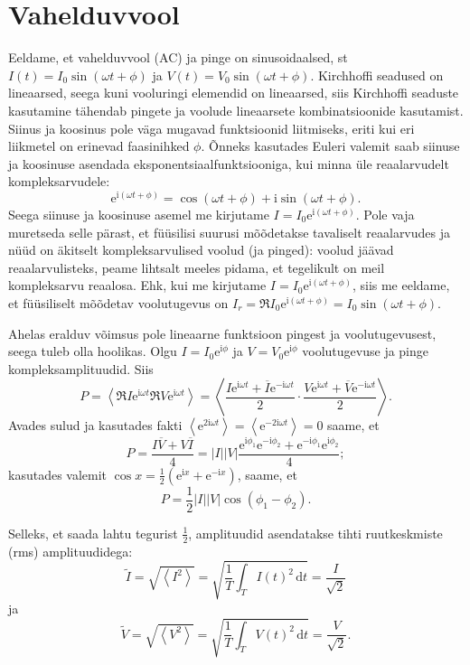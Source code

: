 \documentclass[a4paper,11pt,twocolumn]{article}
\newcommand*\iu{\mathrm{i}}
\begin{document}
\section{Vahelduvvool}
Eeldame, et vahelduvvool (AC) ja pinge on sinusoidaalsed, st $I(t)=I_0 \sin(\omega t + \phi)$ ja $V(t)=V_0 \sin(\omega t + \phi)$.
Kirchhoffi seadused on lineaarsed, seega kuni vooluringi elemendid on lineaarsed, siis Kirchhoffi seaduste kasutamine tähendab pingete ja voolude lineaarsete kombinatsioonide kasutamist.
Siinus ja koosinus pole väga mugavad funktsioonid liitmiseks, eriti kui eri liikmetel on erinevad faasinihked $\phi$.
Õnneks kasutades Euleri valemit saab siinuse ja koosinuse asendada eksponentsiaalfunktsiooniga, kui minna üle reaalarvudelt kompleksarvudele:
\[
    \mathrm{e}^{\iu(\omega t + \phi)}=\cos(\omega t + \phi) + \iu \sin(\omega t + \phi)
.\]
Seega siinuse ja koosinuse asemel me kirjutame $I=I_0 \mathrm{e}^{\iu (\omega t + \phi)}$.
Pole vaja muretseda selle pärast, et füüsilisi suurusi mõõdetakse tavaliselt reaalarvudes ja nüüd on äkitselt kompleksarvulised voolud (ja pinged): voolud jäävad reaalarvulisteks, peame lihtsalt meeles pidama, et tegelikult on meil kompleksarvu reaalosa.
Ehk, kui me kirjutame $I=I_0 \mathrm{e}^{\iu (\omega t + \phi)}$, siis me eeldame, et füüsiliselt mõõdetav voolutugevus on $I_r=\Re I_0 \mathrm{e}^{\iu (\omega t + \phi)}=I_0 \sin(\omega t + \phi)$.


Ahelas eralduv võimsus pole lineaarne funktsioon pingest ja voolutugevusest, seega tuleb olla hoolikas.
Olgu $I=I_0 \mathrm{e}^{\iu \phi}$ ja $V=V_0  \mathrm{e}^{\iu \phi}$ voolutugevuse ja pinge kompleksamplituudid.
Siis
\[
    P=\left< \Re I \mathrm{e}^{\iu \omega t} \Re V \mathrm{e}^{\iu \omega t} \right> = \left<\frac{I \mathrm{e}^{\iu \omega t} + \overline{I}\mathrm{e}^{-\iu \omega t}}{2} \cdot \frac{V \mathrm{e}^{\iu \omega t} + \overline{V}\mathrm{e}^{-\iu \omega t}}{2} \right>
.\]
Avades sulud ja kasutades fakti $\left< \mathrm{e}^{2 \iu \omega t} \right> = \left<\mathrm{e}^{-2 \iu \omega t} \right> =0$ saame, et
\[
    P=\frac{I \overline{V}+V\overline{I}}{4}=|I| |V| \frac{\mathrm{e}^{\iu \phi_1}\mathrm{e}^{-\iu \phi_2} + \mathrm{e}^{-\iu\phi_1}\mathrm{e}^{\iu \phi_2}}{4}
;\]
kasutades valemit $\cos x=\frac{1}{2}\left( \mathrm{e}^{\iu x}+ \mathrm{e}^{-\iu x} \right) $, saame, et
\[
    P=\frac{1}{2}|I| |V| \cos(\phi_1-\phi_2)
.\]

Selleks, et saada lahtu tegurist $\frac{1}{2}$, amplituudid asendatakse tihti ruutkeskmiste (rms) amplituudidega:
\[
    \tilde{I}=\sqrt{\left< I^2 \right>} =\sqrt{\frac{1}{T} \int_T I(t)^2 \, \mathrm{d}t} = \frac{I}{\sqrt{2}}
\] ja
\[
    \tilde{V}=\sqrt{\left< V^2 \right>} =\sqrt{\frac{1}{T} \int_T V(t)^2 \, \mathrm{d}t} = \frac{V}{\sqrt{2}}
.\]
\end{document}

